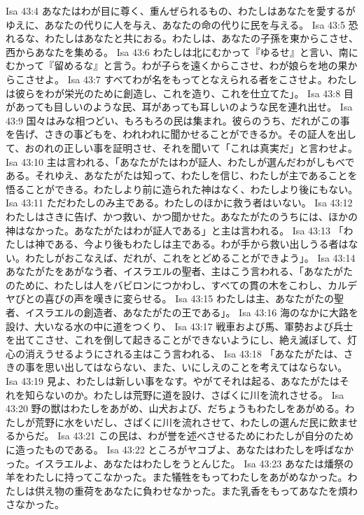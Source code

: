 Isa 43:4  あなたはわが目に尊く、重んぜられるもの、わたしはあなたを愛するがゆえに、あなたの代りに人を与え、あなたの命の代りに民を与える。
Isa 43:5  恐れるな、わたしはあなたと共におる。わたしは、あなたの子孫を東からこさせ、西からあなたを集める。
Isa 43:6  わたしは北にむかって『ゆるせ』と言い、南にむかって『留めるな』と言う。わが子らを遠くからこさせ、わが娘らを地の果からこさせよ。
Isa 43:7  すべてわが名をもってとなえられる者をこさせよ。わたしは彼らをわが栄光のために創造し、これを造り、これを仕立てた」。
Isa 43:8  目があっても目しいのような民、耳があっても耳しいのような民を連れ出せ。
Isa 43:9  国々はみな相つどい、もろもろの民は集まれ。彼らのうち、だれがこの事を告げ、さきの事どもを、われわれに聞かせることができるか。その証人を出して、おのれの正しい事を証明させ、それを聞いて「これは真実だ」と言わせよ。
Isa 43:10  主は言われる、「あなたがたはわが証人、わたしが選んだわがしもべである。それゆえ、あなたがたは知って、わたしを信じ、わたしが主であることを悟ることができる。わたしより前に造られた神はなく、わたしより後にもない。
Isa 43:11  ただわたしのみ主である。わたしのほかに救う者はいない。
Isa 43:12  わたしはさきに告げ、かつ救い、かつ聞かせた。あなたがたのうちには、ほかの神はなかった。あなたがたはわが証人である」と主は言われる。
Isa 43:13  「わたしは神である、今より後もわたしは主である。わが手から救い出しうる者はない。わたしがおこなえば、だれが、これをとどめることができよう」。
Isa 43:14  あなたがたをあがなう者、イスラエルの聖者、主はこう言われる、「あなたがたのために、わたしは人をバビロンにつかわし、すべての貫の木をこわし、カルデヤびとの喜びの声を嘆きに変らせる。
Isa 43:15  わたしは主、あなたがたの聖者、イスラエルの創造者、あなたがたの王である」。
Isa 43:16  海のなかに大路を設け、大いなる水の中に道をつくり、
Isa 43:17  戦車および馬、軍勢および兵士を出てこさせ、これを倒して起きることができないようにし、絶え滅ぼして、灯心の消えうせるようにされる主はこう言われる、
Isa 43:18  「あなたがたは、さきの事を思い出してはならない、また、いにしえのことを考えてはならない。
Isa 43:19  見よ、わたしは新しい事をなす。やがてそれは起る、あなたがたはそれを知らないのか。わたしは荒野に道を設け、さばくに川を流れさせる。
Isa 43:20  野の獣はわたしをあがめ、山犬および、だちょうもわたしをあがめる。わたしが荒野に水をいだし、さばくに川を流れさせて、わたしの選んだ民に飲ませるからだ。
Isa 43:21  この民は、わが誉を述べさせるためにわたしが自分のために造ったものである。
Isa 43:22  ところがヤコブよ、あなたはわたしを呼ばなかった。イスラエルよ、あなたはわたしをうとんじた。
Isa 43:23  あなたは燔祭の羊をわたしに持ってこなかった。また犠牲をもってわたしをあがめなかった。わたしは供え物の重荷をあなたに負わせなかった。また乳香をもってあなたを煩わさなかった。
